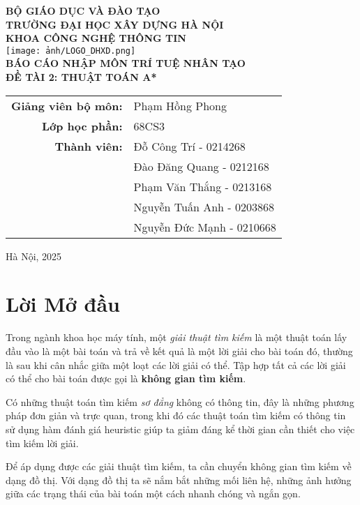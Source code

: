 \documentclass{article}
\begin{document}
\begin{titlepage}
\begin{center}
\textbf{BỘ GIÁO DỤC VÀ ĐÀO TẠO}\\[0.5cm]
\textbf{TRƯỜNG ĐẠI HỌC XÂY DỰNG HÀ NỘI}\\[0.5cm]
\textbf{KHOA CÔNG NGHỆ THÔNG TIN}\\[1cm]

\texttt{[image: ảnh/LOGO\_DHXD.png]}\\[1cm]

\Large\textbf{BÁO CÁO NHẬP MÔN TRÍ TUỆ NHÂN TẠO}\\[0.5cm]
\Large\textbf{ĐỀ TÀI 2: THUẬT TOÁN A*}\\[1cm]

\begin{tabular}{rl}
\textbf{Giảng viên bộ môn:} & Phạm Hồng Phong \\
\textbf{Lớp học phần:} & 68CS3 \\
\textbf{Thành viên:} & Đỗ Công Trí - 0214268 \\
 & Đào Đăng Quang - 0212168 \\
 & Phạm Văn Thắng - 0213168 \\
 & Nguyễn Tuấn Anh - 0203868 \\
 & Nguyễn Đức Mạnh - 0210668 \\
\end{tabular}

\vfill
Hà Nội, 2025
\end{center}
\end{titlepage}
\newpage
\tableofcontents
\newpage
\section*{Lời Mở đầu}

Trong ngành khoa học máy tính, một \textit{giải thuật tìm kiếm} 
là một thuật toán lấy đầu vào là một bài toán và trả về kết quả là một lời giải cho bài toán đó, 
thường là sau khi cân nhắc giữa một loạt các lời giải có thể. 
Tập hợp tất cả các lời giải có thể cho bài toán được gọi là \textbf{không gian tìm kiếm}. 

Có những thuật toán tìm kiếm \textit{sơ đẳng} không có thông tin, 
đây là những phương pháp đơn giản và trực quan, 
trong khi đó các thuật toán tìm kiếm có thông tin sử dụng hàm đánh giá heuristic 
giúp ta giảm đáng kể thời gian cần thiết cho việc tìm kiếm lời giải.

Để áp dụng được các giải thuật tìm kiếm, 
ta cần chuyển không gian tìm kiếm về dạng đồ thị. 
Với dạng đồ thị ta sẽ nắm bắt những mối liên hệ, những ảnh hưởng giữa các trạng thái của bài toán 
một cách nhanh chóng và ngắn gọn. 
\end{document}
